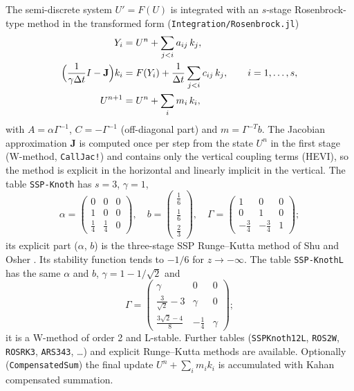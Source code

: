 \documentclass[11pt,a4paper]{article}
\newcommand{\code}[1]{\texttt{#1}}
\begin{document}
The semi-discrete system $U' = F(U)$ is integrated with an $s$-stage
Rosenbrock-type method in the transformed form \cite{HairerWanner}
(\code{Integration/Rosenbrock.jl})
\begin{align}
  Y_i &= U^n + \sum_{j<i} a_{ij}\,k_j,\\
  \Bigl(\frac{1}{\gamma\Delta t}I - \mathbf J\Bigr)k_i &= F(Y_i)
    + \frac{1}{\Delta t}\sum_{j<i} c_{ij}\,k_j, \qquad i = 1,\dots,s,\\
  U^{n+1} &= U^n + \sum_{i} m_i\,k_i,
\end{align}
with $A = \alpha\Gamma^{-1}$, $C = -\Gamma^{-1}$ (off-diagonal part) and
$m = \Gamma^{-T}b$. The Jacobian approximation $\mathbf J$ is computed once
per step from the state $U^n$ in the first stage (W-method,
\code{CallJac!}) and contains only the vertical
coupling terms (HEVI), so the method is explicit in the horizontal and
linearly implicit in the vertical. The table \code{SSP-Knoth} has
$s=3$, $\gamma=1$,
\begin{equation}
  \alpha = \begin{pmatrix} 0&0&0\\ 1&0&0\\ \tfrac14&\tfrac14&0\end{pmatrix},\quad
  b = \begin{pmatrix}\tfrac16\\ \tfrac16\\ \tfrac23\end{pmatrix},\quad
  \Gamma = \begin{pmatrix} 1&0&0\\ 0&1&0\\ -\tfrac34&-\tfrac34&1\end{pmatrix};
\end{equation}
its explicit part ($\alpha$, $b$) is the three-stage SSP Runge--Kutta method
of Shu and Osher \cite{ShuOsher1988}. Its stability function tends to
$-1/6$ for $z\to-\infty$. The table \code{SSP-KnothL} \cite{Artiano2026}
has the same $\alpha$ and $b$, $\gamma = 1-1/\sqrt2$ and
\begin{equation}
  \Gamma = \begin{pmatrix} \gamma&0&0\\ \tfrac3{\sqrt2}-3&\gamma&0\\
    \tfrac{3\sqrt2-4}8&-\tfrac14&\gamma\end{pmatrix};
\end{equation}
it is a W-method of order 2 and L-stable. Further tables (\code{SSPKnoth12L}, \code{ROS2W},
\code{ROSRK3}, \code{ARS343}, \dots) and explicit Runge--Kutta methods are
available. Optionally (\code{CompensatedSum}) the final update
$U^n + \sum_i m_i k_i$ is accumulated with Kahan compensated summation.
\end{document}
